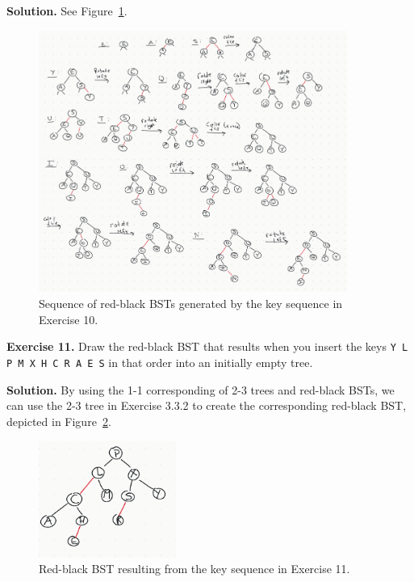 \documentclass[12pt, a4paper]{article}
\newenvironment{ex}[2][Exercise]
{\par\medskip\noindent \textbf{#1 #2.}}
{\medskip}
\newenvironment{sol}[1][Solution]
{\par\medskip\noindent \textbf{#1.} }
{\medskip}
\begin{document}
	\begin{sol}
		 See Figure~\ref{fig:ex-10}.
		 \begin{figure}
		 	\centering
		 	\includegraphics[width=0.9\textwidth]{exercise-10}
		 	\caption{Sequence of red-black BSTs generated by the key sequence in Exercise 10.}
		 	\label{fig:ex-10}
		 \end{figure}
	\end{sol}
	\begin{ex}{11}
		Draw the red-black BST that results when you insert the keys
		\texttt{Y L P M X H C R A E S} in that order into an initially empty tree.
	\end{ex}
	\begin{sol}
		By using the 1-1 corresponding of 2-3 trees and red-black BSTs, we can use the 2-3
		tree in Exercise 3.3.2 to create the corresponding red-black BST, depicted
		in Figure~\ref{fig:ex-11}.
		\begin{figure}
			\centering
			\includegraphics[width=0.4\textwidth]{exercise-11}
			\caption{Red-black BST resulting from the key sequence in Exercise 11.}
			\label{fig:ex-11}
		\end{figure}
	\end{sol}
\end{document}
